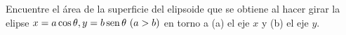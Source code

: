 \item Encuentre el área de la superficie del elipsoide que se obtiene al hacer girar la elipse $x = a \cos \theta, y = b \operatorname{sen} \theta \ (a > b)$ en torno a (a) el eje $x$ y (b) el eje $y$.
